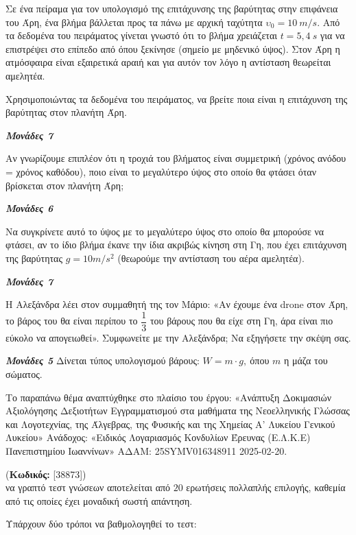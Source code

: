 \documentclass[11pt,a4paper,twoside]{book}
\newcounter{askhsh}[chapter]
\renewcommand{\theaskhsh}{
	\bf{\titlefont{\Large{\thechapter}}.\arabic{askhsh}}
}
\newcommand{\Askhsh}[2]{\refstepcounter{askhsh}{\titlefont{Άσκηση\theaskhsh} - \textcolor{maincolor}{ΘΕΜΑ #2}} (\small{\textbf{Κωδικός:} #1})\\}{}
\newcommand{\monades}[1]{
\hspace*{\fill}
\textbf{\textit{\textcolor{maincolor}{Μονάδες #1}}}}
\begin{document}
Σε ένα πείραμα για τον υπολογισμό της επιτάχυνσης της βαρύτητας στην επιφάνεια του Άρη, ένα βλήμα βάλλεται προς τα πάνω με αρχική ταχύτητα $\upsilon_{0} = 10\ m/s$. Από τα δεδομένα του πειράματος γίνεται γνωστό ότι το βλήμα χρειάζεται $t = 5,4\ s$ για να επιστρέψει στο επίπεδο από όπου ξεκίνησε (σημείο με μηδενικό ύψος). Στον Άρη η ατμόσφαιρα είναι εξαιρετικά αραιή και για αυτόν τον λόγο η αντίσταση θεωρείται αμελητέα.

\begin{alist}
\item Χρησιμοποιώντας τα δεδομένα του πειράματος, να βρείτε ποια είναι η επιτάχυνση της βαρύτητας στον πλανήτη Άρη.
\monades{7}
\item \begin{alist}
\item Αν γνωρίζουμε επιπλέον ότι η τροχιά του βλήματος είναι συμμετρική (χρόνος ανόδου = χρόνος καθόδου), ποιο είναι το μεγαλύτερο ύψος στο οποίο θα φτάσει όταν βρίσκεται στον πλανήτη Άρη;
\monades{6}
\item
  Να συγκρίνετε αυτό το ύψος με το μεγαλύτερο ύψος στο οποίο θα μπορούσε να φτάσει, αν το ίδιο βλήμα έκανε την ίδια ακριβώς κίνηση στη Γη, που έχει επιτάχυνση της βαρύτητας $g = 10m/s^{2}$ (θεωρούμε την αντίσταση του αέρα αμελητέα). 
\monades{7}
\end{alist}
\item Η Αλεξάνδρα λέει στον συμμαθητή της τον Μάριο: «Αν έχουμε ένα drone στον Άρη, το βάρος του θα είναι περίπου το $\dfrac{1}{3}$ του βάρους που θα είχε στη Γη, άρα είναι πιο εύκολο να απογειωθεί». Συμφωνείτε με την Αλεξάνδρα; Να εξηγήσετε την σκέψη σας.
\monades{5}
Δίνεται τύπος υπολογισμού βάρους: $W = m \cdot g,\ $όπου $m$ η μάζα του σώματος.

{\footnotesize Το παραπάνω θέμα αναπτύχθηκε στο πλαίσιο του έργου: «Ανάπτυξη Δοκιμασιών Αξιολόγησης Δεξιοτήτων Εγγραμματισμού στα μαθήματα της Νεοελληνικής Γλώσσας και Λογοτεχνίας, της Άλγεβρας, της Φυσικής και της Χημείας Α' Λυκείου Γενικού Λυκείου» Ανάδοχος: «Ειδικός Λογαριασμός Κονδυλίων Έρευνας (Ε.Λ.Κ.Ε) Πανεπιστημίου Ιωαννίνων» ΑΔΑΜ: 25SYMV016348911 2025-02-20.}
\end{alist}

\vspace{4mm}

\Askhsh{[38873]}
Ένα γραπτό τεστ γνώσεων αποτελείται από $20$ ερωτήσεις πολλαπλής επιλογής, καθεμία από τις οποίες έχει μοναδική σωστή απάντηση.

Υπάρχουν δύο τρόποι να βαθμολογηθεί το τεστ:
\end{document}
